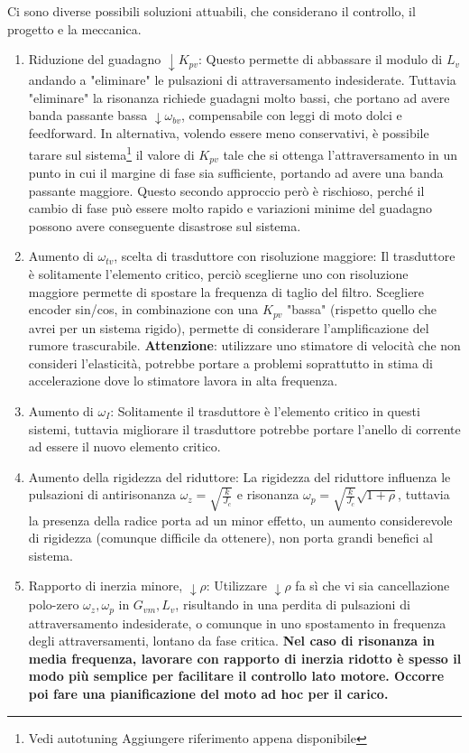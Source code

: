 Ci sono diverse possibili soluzioni attuabili, che considerano il controllo, il progetto e la meccanica.
\begin{enumerate}[label=\roman*.]
    \item Riduzione del guadagno \(\downarrow K_{pv}\): Questo permette di abbassare il modulo di \(L_v\) andando a "eliminare" le pulsazioni di attraversamento indesiderate. Tuttavia "eliminare" la risonanza richiede guadagni molto bassi, che portano ad avere banda passante bassa \(\downarrow \omega_{bv}\), compensabile con leggi di moto dolci e feedforward.
    In alternativa, volendo essere meno conservativi, è possibile tarare sul sistema\footnote{Vedi autotuning {\color{red} Aggiungere riferimento appena disponibile}} il valore di \(K_{pv}\) tale che si ottenga l'attraversamento in un punto in cui il margine di fase sia sufficiente, portando ad avere una banda passante maggiore. Questo secondo approccio però è rischioso, perché il cambio di fase può essere molto rapido e variazioni minime del guadagno possono avere conseguente disastrose sul sistema.
    \item Aumento di \(\omega_{tv}\), scelta di trasduttore con risoluzione maggiore: Il trasduttore è solitamente l'elemento critico, perciò sceglierne uno con risoluzione maggiore permette di spostare la frequenza di taglio del filtro. Scegliere encoder sin/cos, in combinazione con una \(K_{pv}\) "bassa" (rispetto quello che avrei per un sistema rigido), permette di considerare l'amplificazione del rumore trascurabile.
    \textbf{Attenzione}: utilizzare uno stimatore di velocità che non consideri l'elasticità, potrebbe portare a problemi soprattutto in stima di accelerazione dove lo stimatore lavora in alta frequenza.
    \item Aumento di \(\omega_I\): Solitamente il trasduttore è l'elemento critico in questi sistemi, tuttavia migliorare il trasduttore potrebbe portare l'anello di corrente ad essere il nuovo elemento critico.
    \item Aumento della rigidezza del riduttore: La rigidezza del riduttore influenza le pulsazioni di antirisonanza \(\omega_z = \sqrt{\frac{k}{J_c}}\) e risonanza \(\omega_p = \sqrt{\frac{k}{J_c}}\sqrt{1+\rho}\), tuttavia la presenza della radice porta ad un minor effetto, un aumento considerevole di rigidezza (comunque difficile da ottenere), non porta grandi benefici al sistema. 
    \item Rapporto di inerzia minore, \(\downarrow \rho\): Utilizzare \(\downarrow \rho\) fa sì che vi sia cancellazione polo-zero \(\omega_z,\omega_p\) in \(G_{vm}, L_v\), risultando in una perdita di pulsazioni di attraversamento indesiderate, o comunque in uno spostamento in frequenza degli attraversamenti, lontano da fase critica. \textbf{Nel caso di risonanza in media frequenza, lavorare con rapporto di inerzia ridotto è spesso il modo più semplice per facilitare il controllo lato motore. Occorre poi fare una pianificazione del moto ad hoc per il carico.}

\end{enumerate}
